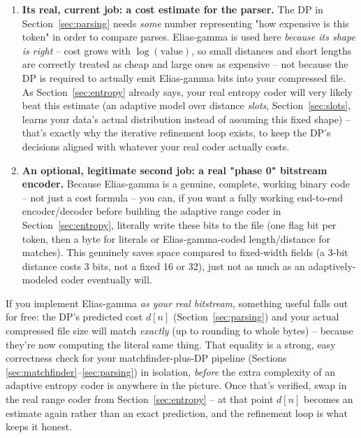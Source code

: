 \documentclass[11pt]{article}
\begin{document}
\begin{enumerate}
  \item \textbf{Its real, current job: a cost estimate for the parser.} The DP in
  Section~\ref{sec:parsing} needs \emph{some} number representing "how expensive is
  this token" in order to compare parses. Elias-gamma is used here \emph{because its
  shape is right} -- cost grows with $\log(\text{value})$, so small distances and short
  lengths are correctly treated as cheap and large ones as expensive -- not because the
  DP is required to actually emit Elias-gamma bits into your compressed file. As
  Section~\ref{sec:entropy} already says, your real entropy coder will very likely beat
  this estimate (an adaptive model over distance \emph{slots}, Section~\ref{sec:slots},
  learns your data's actual distribution instead of assuming this fixed shape) -- that's
  exactly why the iterative refinement loop exists, to keep the DP's decisions aligned
  with whatever your real coder actually costs.
  \item \textbf{An optional, legitimate second job: a real "phase 0" bitstream encoder.}
  Because Elias-gamma is a genuine, complete, working binary code -- not just a cost
  formula -- you can, if you want a fully working end-to-end encoder/decoder before
  building the adaptive range coder in Section~\ref{sec:entropy}, literally write these
  bits to the file (one flag bit per token, then a byte for literals or Elias-gamma-coded
  length/distance for matches). This genuinely saves space compared to fixed-width
  fields (a 3-bit distance costs 3 bits, not a fixed 16 or 32), just not as much as an
  adaptively-modeled coder eventually will.
\end{enumerate}

\begin{tcolorbox}[colback=blue!5!white,colframe=blue!50!black,title={Why building the "phase 0" encoder first is worth doing, not just a shortcut}]
If you implement Elias-gamma \emph{as your real bitstream}, something useful falls out
for free: the DP's predicted cost $d[n]$ (Section~\ref{sec:parsing}) and your actual
compressed file size will match \emph{exactly} (up to rounding to whole bytes) --
because they're now computing the literal same thing. That equality is a strong,
easy correctness check for your matchfinder-plus-DP pipeline (Sections
\ref{sec:matchfinder}--\ref{sec:parsing}) in isolation, \emph{before} the extra
complexity of an adaptive entropy coder is anywhere in the picture. Once that's
verified, swap in the real range coder from Section~\ref{sec:entropy} -- at that point
$d[n]$ becomes an estimate again rather than an exact prediction, and the refinement
loop is what keeps it honest.
\end{tcolorbox}
\end{document}
